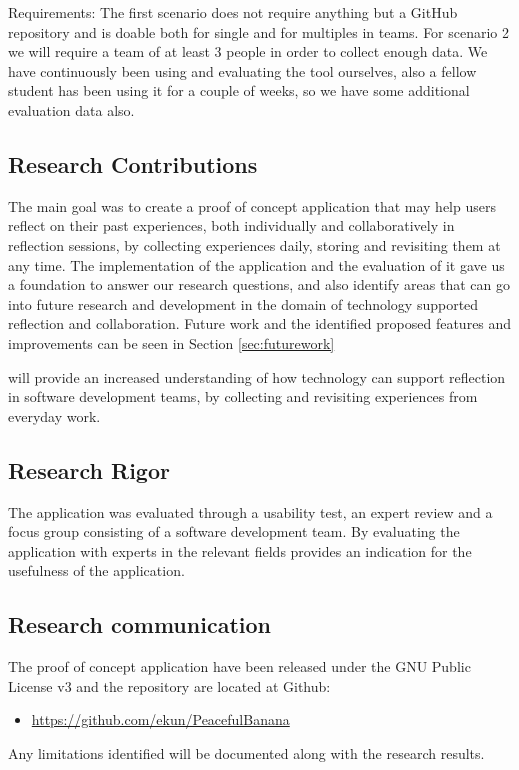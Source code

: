 Requirements: 
The first scenario does not require anything but a GitHub repository and is doable both for single and for multiples in teams.
For scenario 2 we will require a team of at least 3 people in order to collect enough data. 
We have continuously been using and evaluating the tool ourselves, also a fellow student has been using it for a couple of weeks, so we have some additional evaluation
data also.

\subsection{Research Contributions}
The main goal was to create a proof of concept application that may help users reflect on their past experiences, both individually and collaboratively in reflection sessions, by collecting experiences daily, storing and revisiting them at any time. The implementation of the application and the evaluation of it gave us a foundation to answer our research questions, and also identify areas that can go into future research and development in the domain of technology supported reflection and collaboration. 
Future work  and the identified proposed features and improvements can be seen in Section \ref{sec:futurework}

 will provide an increased understanding of how technology can support reflection in software development teams, by collecting and revisiting experiences from everyday work. 

\subsection{Research Rigor}
The application was evaluated through a usability test, an expert review and a focus group consisting of a software development team. By evaluating the application with experts in the relevant fields provides an indication for the usefulness of the application.

\subsection{Research communication}
The proof of concept application have been released under the GNU Public License v3 and the repository are located at Github: 
\begin{itemize}
	\item \url{https://github.com/ekun/PeacefulBanana}
\end{itemize} 
Any limitations identified  will be documented along with the research results. 



